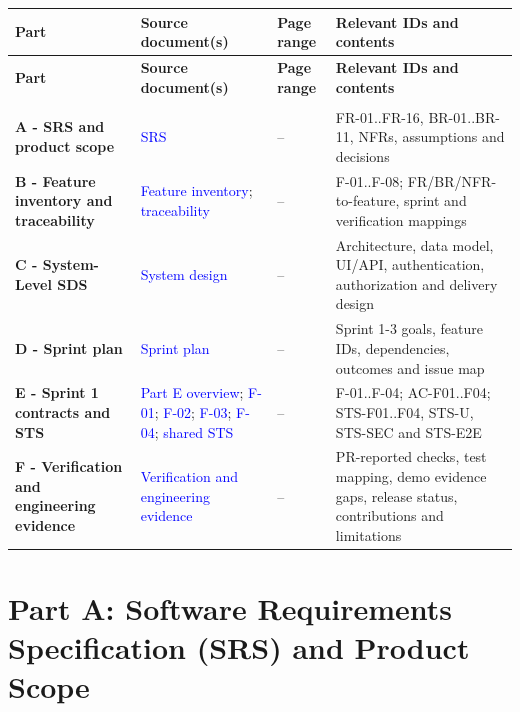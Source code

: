 \documentclass[12pt,a4paper]{article}
\begin{document}
{\setlength{\tabcolsep}{3pt}\renewcommand{\arraystretch}{1.08}\small
\begin{longtable}{@{}>{\raggedright\arraybackslash}p{}>{\raggedright\arraybackslash}p{}>{\raggedright\arraybackslash}p{}>{\raggedright\arraybackslash}p{}@{}}
\toprule
\textbf{Part} & \textbf{Source document(s)} & \textbf{Page range} & \textbf{Relevant IDs and contents} \\
\midrule
\endfirsthead
\toprule
\textbf{Part} & \textbf{Source document(s)} & \textbf{Page range} & \textbf{Relevant IDs and contents} \\
\midrule
\endhead
\midrule
\multicolumn{4}{r}{\footnotesize\textit{Continued on next page}}\\
\endfoot
\bottomrule
\endlastfoot
\textbf{A - SRS and product scope} & \textcolor{blue}{SRS} & \pageref{part-a-start}--\pageref{part-a-end} & FR-01..FR-16, BR-01..BR-11, NFRs, assumptions and decisions \\
\textbf{B - Feature inventory and traceability} & \textcolor{blue}{Feature inventory}; \textcolor{blue}{traceability} & \pageref{part-b-start}--\pageref{part-b-end} & F-01..F-08; FR/BR/NFR-to-feature, sprint and verification mappings \\
\textbf{C - System-Level SDS} & \textcolor{blue}{System design} & \pageref{part-c-start}--\pageref{part-c-end} & Architecture, data model, UI/API, authentication, authorization and delivery design \\
\textbf{D - Sprint plan} & \textcolor{blue}{Sprint plan} & \pageref{part-d-start}--\pageref{part-d-end} & Sprint 1-3 goals, feature IDs, dependencies, outcomes and issue map \\
\textbf{E - Sprint 1 contracts and STS} & \textcolor{blue}{Part E overview}; \textcolor{blue}{F-01}; \textcolor{blue}{F-02}; \textcolor{blue}{F-03}; \textcolor{blue}{F-04}; \textcolor{blue}{shared STS} & \pageref{part-e-start}--\pageref{part-e-end} & F-01..F-04; AC-F01..F04; STS-F01..F04, STS-U, STS-SEC and STS-E2E \\
\textbf{F - Verification and engineering evidence} & \textcolor{blue}{Verification and engineering evidence} & \pageref{part-f-start}--\pageref{part-f-end} & PR-reported checks, test mapping, demo evidence gaps, release status, contributions and limitations \\
\end{longtable}}
\clearpage

\section{Part A: Software Requirements Specification (SRS) and Product Scope}
\end{document}
